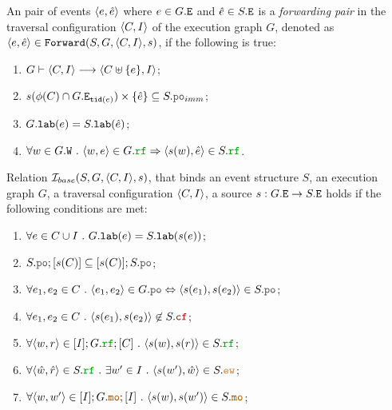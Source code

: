 \documentclass[12pt]{article}
\begin{document}
\begin{definition}
  An pair of events $\langle e, \hat{e} \rangle$ where $e \in G.{\mathtt{E}}$ and $\hat{e} \in S.{\mathtt{E}}$
  is a \emph{forwarding pair} in
  the traversal configuration $\langle C, I \rangle$ of the \imm execution graph $G$,
  denoted as $\langle e, \hat{e} \rangle \in {\mathtt{Forward}}(S, G, \langle C, I \rangle, s)$, if the following is true:
  \begin{enumerate}[label=\textbf{F.\arabic*}]

    \item \label{item:frwd-coverable}
      $G \vdash \langle C, I \rangle \longrightarrow \langle C \uplus \{e\}, I \rangle$;

    \item \label{item:frwd-front}
      $s(\front(C) \cap G.\lEi{\lTID(e)}) \times \{\hat{e}\} \subseteq S.\lPO_{imm}$;
      
    \item \label{item:frwd-lab}
      $G.{\mathtt{lab}}(e) = S.{\mathtt{lab}}(\hat{e})$;

    \item \label{item:frwd-rf}
      $\forall{w \in G.\lW} ~.~ \tup{w, e} \in G.\lRF \Rightarrow \tup{s(w), \hat{e}} \in S.\lRF$.

  \end{enumerate}
\end{definition}

\begin{definition}
  Relation $\mathcal{I}_{base}(S, G, \langle C, I \rangle, s)$, that binds an 
  event structure $S$, an \imm execution graph $G$,
  a traversal configuration $\langle C, I \rangle$,
  a source $s : G.{\mathtt{E}} \rightarrow S.{\mathtt{E}}$ 
  holds if the following conditions are met:
  \begin{enumerate}[label=\textbf{S.\arabic*}]

  \item \label{item:sim-lab}
    $\forall{e \in C \cup I} ~.~ G.{\mathtt{lab}}(e) = S.{\mathtt{lab}}(s(e))$;

  \item \label{item:sim-po-prfx} 
    $S.\lPO;[s(C)] \subseteq [s(C)];S.\lPO$;

  \item \label{item:sim-po}
    $\forall{e_1, e_2 \in C} ~.~ \tup{e_1, e_2} \in G.\lPO \Leftrightarrow \tup{s(e_1), s(e_2)} \in S.\lPO$;
    
  \item \label{item:sim-cf}
    $\forall{e_1, e_2 \in C} ~.~ \tup{s(e_1), s(e_2)} \not\in S.\lCF$;

  \item \label{item:sim-rf} 
    $\forall{\tup{w, r} \in [I];G.\lRF;[C]} ~.~ \tup{s(w), s(r)} \in S.\lRF$;

  \item \label{item:sim-jf}
    $\forall{\tup{\hat{w}, \hat{r}} \in S.\lRF} ~.~ \exists{w' \in I} ~.~ \tup{s(w'), \hat{w}} \in S.\lEW$;

    \item \label{item:sim-mo}
      $\forall{\tup{w, w'} \in [I];G.\lMO;[I]} ~.~ \tup{s(w), s(w')} \in S.\lMO$;

    
  \end{enumerate}
\end{definition}
\end{document}
